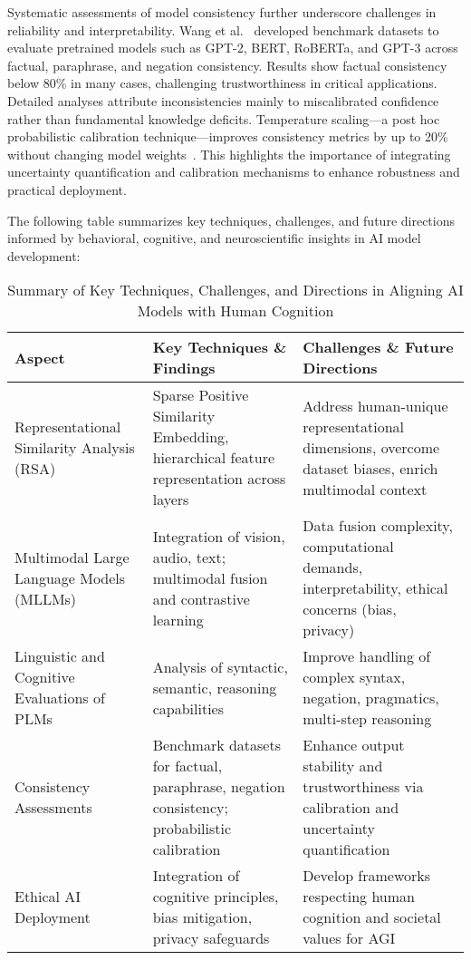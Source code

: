 \documentclass[sigconf]{acmart}
\begin{document}
Systematic assessments of model consistency further underscore challenges in reliability and interpretability. Wang et al.~\cite{ref35} developed benchmark datasets to evaluate pretrained models such as GPT-2, BERT, RoBERTa, and GPT-3 across factual, paraphrase, and negation consistency. Results show factual consistency below 80\% in many cases, challenging trustworthiness in critical applications. Detailed analyses attribute inconsistencies mainly to miscalibrated confidence rather than fundamental knowledge deficits. Temperature scaling—a post hoc probabilistic calibration technique—improves consistency metrics by up to 20\% without changing model weights~\cite{ref35}. This highlights the importance of integrating uncertainty quantification and calibration mechanisms to enhance robustness and practical deployment.

The following table summarizes key techniques, challenges, and future directions informed by behavioral, cognitive, and neuroscientific insights in AI model development:

\begin{table*}[htbp]
\centering
\caption{Summary of Key Techniques, Challenges, and Directions in Aligning AI Models with Human Cognition}
\label{tab:summary_bcns}
\begin{adjustbox}{max width=\textwidth}
\begin{tabular}{@{}lll@{}}
\toprule
\textbf{Aspect} & \textbf{Key Techniques \& Findings} & \textbf{Challenges \& Future Directions} \\ \midrule
Representational Similarity Analysis (RSA) & Sparse Positive Similarity Embedding, hierarchical feature representation across layers~\cite{ref1,ref2} & Address human-unique representational dimensions, overcome dataset biases, enrich multimodal context~\cite{ref2,ref4,ref5} \\
Multimodal Large Language Models (MLLMs) & Integration of vision, audio, text; multimodal fusion and contrastive learning~\cite{ref4,ref5} & Data fusion complexity, computational demands, interpretability, ethical concerns (bias, privacy)~\cite{ref4,ref5} \\
Linguistic and Cognitive Evaluations of PLMs & Analysis of syntactic, semantic, reasoning capabilities~\cite{ref34} & Improve handling of complex syntax, negation, pragmatics, multi-step reasoning~\cite{ref34} \\
Consistency Assessments & Benchmark datasets for factual, paraphrase, negation consistency; probabilistic calibration~\cite{ref35} & Enhance output stability and trustworthiness via calibration and uncertainty quantification~\cite{ref35} \\
Ethical AI Deployment & Integration of cognitive principles, bias mitigation, privacy safeguards~\cite{ref2,ref4,ref5} & Develop frameworks respecting human cognition and societal values for AGI~\cite{ref2,ref4,ref5} \\ \bottomrule
\end{tabular}
\end{adjustbox}
\end{table*}
\end{document}
